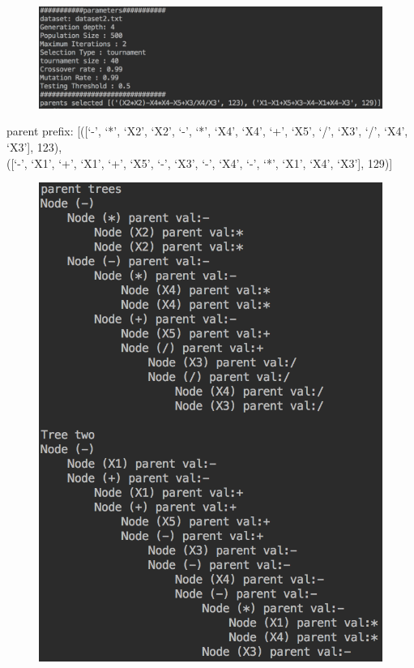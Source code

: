 \documentclass[11pt]{article}
\begin{document}
\begin{figure}[h]
\centering
\includegraphics[scale = .60]{1}
\end{figure}
parent prefix:  [([`-', `*', `X2', `X2', `-', `*', `X4', `X4', `+', `X5', `/', `X3', `/', `X4', `X3'], 123), \\
([`-', `X1', `+', `X1', `+', `X5', `-', `X3', `-', `X4', `-', `*', `X1', `X4', `X3'], 129)]
\begin{figure}[h]
\centering
\includegraphics[scale = .60]{2}

\end{figure}
\end{document}
